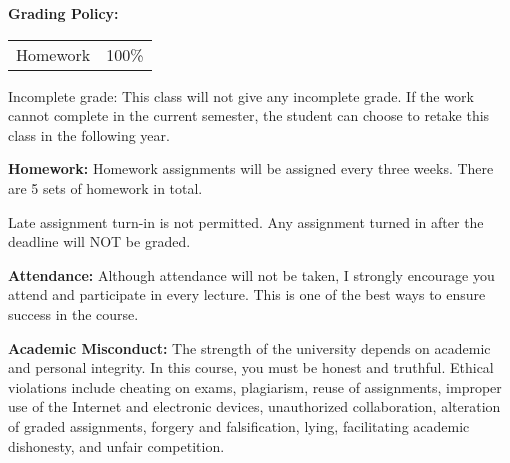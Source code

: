 \documentclass[a4paper,10pt]{article}
\begin{document}
\textbf{Grading Policy:}

\begin{tabular}{lr}
Homework & 100\%\\
\end{tabular}




Incomplete grade: This class will not give any
incomplete grade. If the work cannot complete in the
current semester, the student can choose to retake this
class in the following year.






\textbf{Homework:} Homework assignments will be assigned every three weeks. There are 5 sets of homework in total. 

Late assignment turn-in is not permitted. Any assignment turned in after the deadline will NOT be graded.




\textbf{Attendance:} Although attendance will not be taken, I strongly encourage you attend and participate in every lecture. This is one of the best ways to ensure success in the course.






\textbf{Academic Misconduct:} The strength of the university depends on academic and personal integrity. In this course, you must be honest 
and truthful. Ethical violations include cheating on exams, plagiarism, reuse of assignments, improper use 
of the Internet and electronic devices, unauthorized collaboration, alteration of graded assignments, forgery 
and falsification, lying, facilitating academic dishonesty, and unfair competition.
\end{document}

